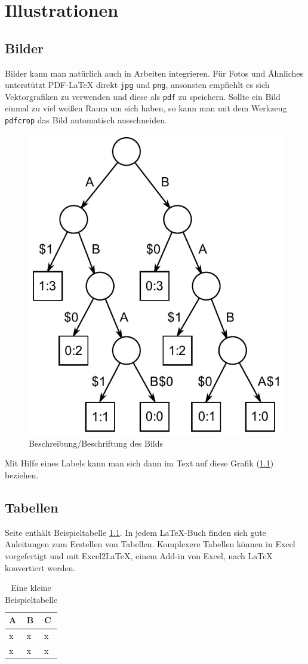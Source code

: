 \chapter{Illustrationen}
\label{ch:illustrationen}

\section{Bilder}
\label{ch:illustrationen:sec:images}

Bilder kann man natürlich auch in Arbeiten integrieren.
Für Fotos und Ähnliches unterstützt PDF-\LaTeX{} direkt \verb|jpg| und \verb|png|, ansonsten empfiehlt es sich Vektorgrafiken zu verwenden und diese als \verb|pdf| zu speichern.
Sollte ein Bild einmal zu viel weißen Raum um sich haben, so kann man mit dem Werkzeug \verb|pdfcrop| das Bild automatisch ausschneiden\cite{pdfcrop}.

\begin{figure} [ht]
\centering
\includegraphics[width=.4\textwidth]{images/Suffix_tree_ABAB_BABA}
\caption{Beschreibung/Beschriftung des Bilds}
\label{fig:bild1}
\end{figure}

Mit Hilfe eines Labels kann man sich dann im Text auf diese Grafik (\ref{fig:bild1}) beziehen. 

\section{Tabellen}
\label{ch:illustrationen:sec:tables}

Seite \pageref{tab:beispieltabelle} enthält Beispieltabelle \ref{tab:beispieltabelle}.
In jedem \LaTeX{}-Buch finden sich gute Anleitungen zum Erstellen von Tabellen.
Komplexere Tabellen können in Excel vorgefertigt und mit Excel2LaTeX, einem Add-in von Excel, nach LaTeX konvertiert werden.

\begin{table}[h]
\begin{center}
\begin{tabular}{|l|l|l|}
	A & B & C \\\hline
	x & x & x \\
	x & x & x
\end{tabular}
\end{center}
\caption{Eine kleine Beispieltabelle}
\label{tab:beispieltabelle}
\end{table}

